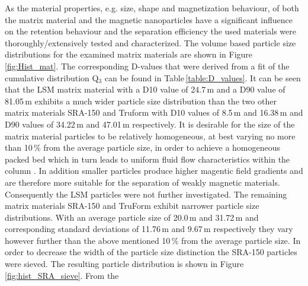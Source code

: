 As the material properties, e.g. size, shape and magnetization behaviour, of both the matrix material and the magnetic nanoparticles have a significant influence on the retention behaviour and the separation efficiency the used materials were thoroughly/extensively tested and characterized. \newline
The volume based particle size distributions for the examined matrix materials are shown in Figure\,\ref{fig:Hist_mat}. The corresponding D-values that were derived from a fit of the cumulative distribution Q$_{3}$ can be found in Table\,\ref{table:D_values}. It can be seen that the LSM matrix material with a D10 value of 24.7\,\textmu m and a D90 value of 81.05\,\textmu m exhibits a much wider particle size distribution than the two other matrix materials SRA-150 and Truform with D10 values of  8.5\,\textmu m and 16.38\,\textmu m and D90 values of 34.22\,\textmu m and 47.01\,\textmu m respectively. It is desirable for the size of the matrix material particles to be relatively homogeneous, at best varying no more than 10\,\% from the average particle size, in order to achieve a homogeneous packed bed which in turn leads to uniform fluid flow characteristics within the column \cite{miltenyi1997magnetic}. In addition smaller particles produce higher magentic field gradients and are therefore more suitable for the separation of weakly magnetic materials. Consequently the LSM particles were not further investigated. The remaining matrix materials SRA-150 and TruForm exhibit narrower particle size distributions. With an average particle size of 20.0\,\textmu m and  31.72\,\textmu m and corresponding standard deviations of 11.76\,\textmu m and 9.67\,\textmu m respectively they vary however further than the above mentioned 10\,\% from the average particle size. In order to decrease the width of the particle size distinction the SRA-150 particles were sieved. The resulting particle distribution is shown in Figure\,\ref{fig:hist_SRA_sieve}. From the  


% 
% 
% 

